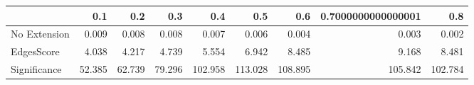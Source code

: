 \begin{tabular}{lrrrrrrrr}
\toprule
{} &    0.1 &    0.2 &    0.3 &     0.4 &     0.5 &     0.6 & 0.7000000000000001 &     0.8 \\
\midrule
No Extension &  0.009 &  0.008 &  0.008 &   0.007 &   0.006 &   0.004 &              0.003 &   0.002 \\
EdgesScore   &  4.038 &  4.217 &  4.739 &   5.554 &   6.942 &   8.485 &              9.168 &   8.481 \\
Significance & 52.385 & 62.739 & 79.296 & 102.958 & 113.028 & 108.895 &            105.842 & 102.784 \\
\bottomrule
\end{tabular}
